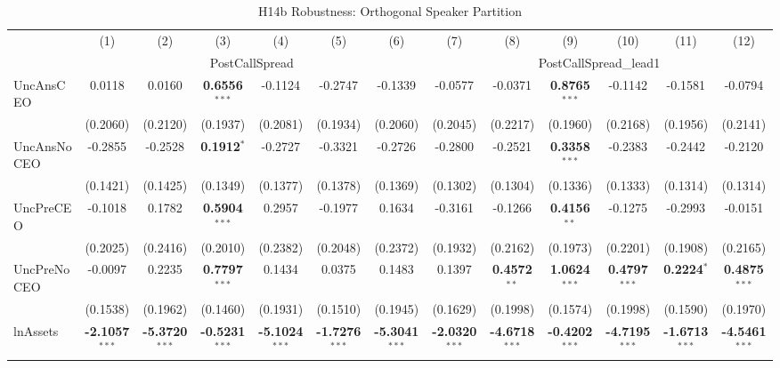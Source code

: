 \begin{landscape}
\begin{table}[H]
\setlength{\tabcolsep}{3pt}
\renewcommand{\arraystretch}{0.85}
\centering
\caption{H14b Robustness: Orthogonal Speaker Partition}
\label{tab:h14b_robust}
\scriptsize
\begin{tabular}{lcccccccccccc}
\toprule
 & (1) & (2) & (3) & (4) & (5) & (6) & (7) & (8) & (9) & (10) & (11) & (12) \\
 & \multicolumn{6}{c}{PostCallSpread} & \multicolumn{6}{c}{PostCallSpread\_lead1} \\
\cmidrule(lr){2-7} \cmidrule(lr){8-13}
\midrule
UncAnsCEO & 0.0118 & 0.0160 & \textbf{0.6556}$^{***}$ & -0.1124 & -0.2747 & -0.1339 & -0.0577 & -0.0371 & \textbf{0.8765}$^{***}$ & -0.1142 & -0.1581 & -0.0794 \\
 & (0.2060) & (0.2120) & (0.1937) & (0.2081) & (0.1934) & (0.2060) & (0.2045) & (0.2217) & (0.1960) & (0.2168) & (0.1956) & (0.2141) \\
UncAnsNoCEO & -0.2855 & -0.2528 & \textbf{0.1912}$^{*}$ & -0.2727 & -0.3321 & -0.2726 & -0.2800 & -0.2521 & \textbf{0.3358}$^{***}$ & -0.2383 & -0.2442 & -0.2120 \\
 & (0.1421) & (0.1425) & (0.1349) & (0.1377) & (0.1378) & (0.1369) & (0.1302) & (0.1304) & (0.1336) & (0.1333) & (0.1314) & (0.1314) \\
UncPreCEO & -0.1018 & 0.1782 & \textbf{0.5904}$^{***}$ & 0.2957 & -0.1977 & 0.1634 & -0.3161 & -0.1266 & \textbf{0.4156}$^{**}$ & -0.1275 & -0.2993 & -0.0151 \\
 & (0.2025) & (0.2416) & (0.2010) & (0.2382) & (0.2048) & (0.2372) & (0.1932) & (0.2162) & (0.1973) & (0.2201) & (0.1908) & (0.2165) \\
UncPreNoCEO & -0.0097 & 0.2235 & \textbf{0.7797}$^{***}$ & 0.1434 & 0.0375 & 0.1483 & 0.1397 & \textbf{0.4572}$^{**}$ & \textbf{1.0624}$^{***}$ & \textbf{0.4797}$^{***}$ & \textbf{0.2224}$^{*}$ & \textbf{0.4875}$^{***}$ \\
 & (0.1538) & (0.1962) & (0.1460) & (0.1931) & (0.1510) & (0.1945) & (0.1629) & (0.1998) & (0.1574) & (0.1998) & (0.1590) & (0.1970) \\
\midrule
lnAssets & \textbf{-2.1057}$^{***}$ & \textbf{-5.3720}$^{***}$ & \textbf{-0.5231}$^{***}$ & \textbf{-5.1024}$^{***}$ & \textbf{-1.7276}$^{***}$ & \textbf{-5.3041}$^{***}$ & \textbf{-2.0320}$^{***}$ & \textbf{-4.6718}$^{***}$ & \textbf{-0.4202}$^{***}$ & \textbf{-4.7195}$^{***}$ & \textbf{-1.6713}$^{***}$ & \textbf{-4.5461}$^{***}$ \\

\end{tabular}
\end{table}
\end{landscape}
